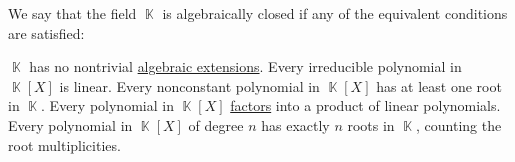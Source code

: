 \begin{definition}\label{def:algebraically_closed_field}
  We say that the field \( \BbbK \) is algebraically closed if any of the equivalent conditions are satisfied:
  \begin{thmenum}
     \( \BbbK \) has no nontrivial \hyperref[def:transcendental_element]{algebraic extensions}.
     Every irreducible polynomial in \( \BbbK[X] \) is linear.
     Every nonconstant polynomial in \( \BbbK[X] \) has at least one root in \( \BbbK \).
     Every polynomial in \( \BbbK[X] \) \hyperref[def:irreducible_factorization]{factors} into a product of linear polynomials.
     Every polynomial in \( \BbbK[X] \) of degree \( n \) has exactly \( n \) roots in \( \BbbK \), counting the root multiplicities.
  \end{thmenum}
\end{definition}
